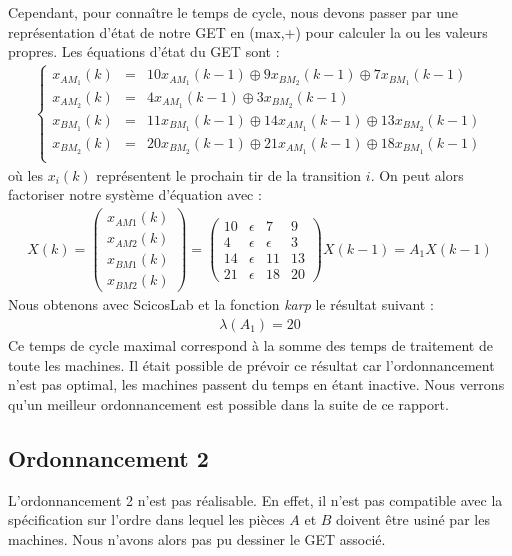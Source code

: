 Cependant, pour connaître le temps de cycle, nous devons passer par une représentation d'état de notre GET en (max,+) pour calculer la ou les valeurs propres. Les équations d'état du GET sont :
\begin{align*}
\left\lbrace
\begin{array}{lcl}
x_{AM_1}(k)&=& 10x_{AM_1}(k-1) \oplus 9x_{BM_2}(k-1)\oplus 7x_{BM_1}(k-1)\\
x_{AM_2}(k)&=&4x_{AM_1}(k-1) \oplus 3x_{BM_2}(k-1)\\
x_{BM_1}(k)&=& 11x_{BM_1}(k-1) \oplus 14x_{AM_1}(k-1) \oplus 13x_{BM_2}(k-1)\\
x_{BM_2}(k)&=& 20x_{BM_2}(k-1) \oplus 21x_{AM_1}(k-1) \oplus 18x_{BM_1}(k-1)\\
\end{array}
\right.
\end{align*}où les $x_i(k)$ représentent le prochain tir de la transition $i$. On peut alors factoriser notre système d'équation avec :
\begin{align}\label{equ:ordo1}
X(k) = \begin{pmatrix}
x_{AM1}(k) \\ x_{AM2}(k) \\ x_{BM1}(k)\\ x_{BM2}(k)
\end{pmatrix} 
= \begin{pmatrix}
10 & \epsilon & 7 &9\\
4 & \epsilon & \epsilon & 3\\
14 & \epsilon & 11 & 13\\
21 & \epsilon & 18 & 20
\end{pmatrix}X(k-1) = A_1X(k-1)
\end{align}
Nous obtenons avec ScicosLab et la fonction \emph{karp} le résultat suivant : \begin{eqnarray*}
\lambda(A_1) = 20
\end{eqnarray*}
Ce temps de cycle maximal correspond à la somme des temps de traitement de toute les machines. Il était possible de prévoir ce résultat car l'ordonnancement n'est pas optimal, les machines passent du temps en étant inactive. Nous verrons qu'un meilleur ordonnancement est possible dans la suite de ce rapport.

\subsection{Ordonnancement 2}
L'ordonnancement 2 n'est pas réalisable. En effet, il n'est pas compatible avec la spécification sur l'ordre dans lequel les pièces $A$ et $B$ doivent être usiné par les machines. Nous n'avons alors pas pu dessiner le GET associé.


